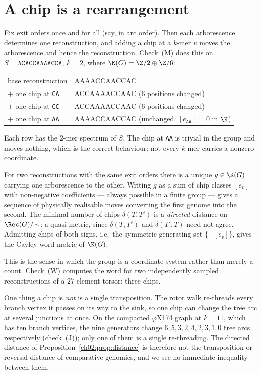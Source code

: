 \section{A chip is a rearrangement}\label{ch02:sec:moves}

Fix exit orders once and for all (say, in arc order). Then each arborescence determines
one reconstruction, and adding a chip at a $k$-mer $v$ moves the arborescence and hence
the reconstruction. Check~(M) does this on $S=\texttt{ACACCAAAACCA}$, $k=2$, where
$\K(G)=\Z/2\oplus\Z/6$:
\begin{center}\ttfamily\small
\begin{tabular}{ll}
base reconstruction & AAAACCAACCAC\\
$+$ one chip at \texttt{CA} & ACCAAAACCAAC \quad(6 positions changed)\\
$+$ one chip at \texttt{CC} & ACCAAAACCAAC \quad(6 positions changed)\\
$+$ one chip at \texttt{AA} & AAAACCAACCAC \quad(unchanged: $[e_{\texttt{AA}}]=0$ in $\K$)\\
\end{tabular}
\end{center}
Each row has the $2$-mer spectrum of $S$. The chip at \texttt{AA} is trivial in the group
and moves nothing, which is the correct behaviour: not every $k$-mer carries a nonzero
coordinate.

\begin{proposition}[Distance]\label{ch02:prop:distance}
For two reconstructions with the same exit orders there is a unique $g\in\K(G)$ carrying
one arborescence to the other. Writing $g$ as a sum of chip classes $[e_v]$ with
non-negative coefficients --- always possible in a finite group --- gives a sequence of
physically realisable moves converting the first genome into the second. The minimal
number of chips $\delta(T,T')$ is a \emph{directed} distance on $\Rec(G)/\!\sim$: a
quasi-metric, since $\delta(T,T')$ and $\delta(T',T)$ need not agree. Admitting chips of
both signs, i.e.\ the symmetric generating set $\{\pm[e_v]\}$, gives the Cayley word
metric of $\K(G)$.
\end{proposition}

This is the sense in which the group is a coordinate system rather than merely a count.
Check~(W) computes the word for two independently sampled reconstructions of a
$27$-element torsor: three chips.

One thing a chip is \emph{not} is a single transposition. The rotor walk re-threads every
branch vertex it passes on its way to the sink, so one chip can change the tree arc at
several junctions at once. On the compacted $\varphi$X174 graph at $k=11$, which has ten
branch vertices, the nine generators change $6,5,3,2,4,2,3,1,0$ tree arcs respectively
(check~(J)); only one of them is a single re-threading. The directed distance of
Proposition~\ref{ch02:prop:distance} is therefore not the transposition or reversal distance
of comparative genomics, and we see no immediate inequality between them.

